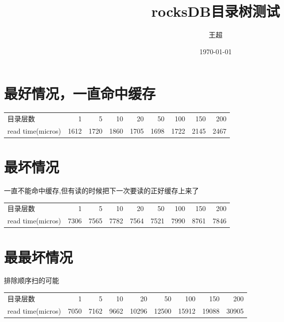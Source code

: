 \documentclass[11pt]{article}
\author{王超}
\date{\today}
\title{rocksDB目录树测试}
\begin{document}
\maketitle
\tableofcontents

\section{最好情况，一直命中缓存}
\label{sec:org7bd7530}
\begin{center}
\begin{tabular}{lrrrrrrrr}
目录层数 & 1 & 5 & 10 & 20 & 50 & 100 & 150 & 200\\
read time(micros) & 1612 & 1720 & 1860 & 1705 & 1698 & 1722 & 2145 & 2467\\
\end{tabular}
\end{center}

\section{最坏情况}
\label{sec:org07f3995}
一直不能命中缓存,但有读的时候把下一次要读的正好缓存上来了
\begin{center}
\begin{tabular}{lrrrrrrrr}
目录层数 & 1 & 5 & 10 & 20 & 50 & 100 & 150 & 200\\
read time(micros) & 7306 & 7565 & 7782 & 7564 & 7521 & 7990 & 8761 & 7846\\
\end{tabular}
\end{center}

\section{最最坏情况}
\label{sec:orgdb771bd}
排除顺序扫的可能
\begin{center}
\begin{tabular}{lrrrrrrrr}
目录层数 & 1 & 5 & 10 & 20 & 50 & 100 & 150 & 200\\
read time(micros) & 7050 & 7162 & 9662 & 10296 & 12500 & 15912 & 19088 & 30905\\
\end{tabular}
\end{center}
\end{document}
